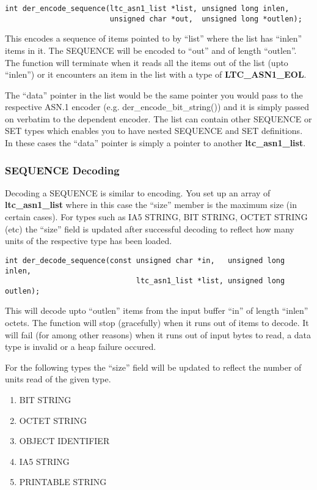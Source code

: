 \documentclass[a4paper]{book}
\begin{document}
\begin{verbatim}
int der_encode_sequence(ltc_asn1_list *list, unsigned long inlen,
                        unsigned char *out,  unsigned long *outlen);
\end{verbatim}
This encodes a sequence of items pointed to by ``list'' where the list has ``inlen'' items in it.  The SEQUENCE will be encoded to ``out'' and of length ``outlen''.  The
function will terminate when it reads all the items out of the list (upto ``inlen'') or it encounters an item in the list with a type of \textbf{LTC\_ASN1\_EOL}.

The ``data'' pointer in the list would be the same pointer you would pass to the respective ASN.1 encoder (e.g. der\_encode\_bit\_string()) and it is simply passed on
verbatim to the dependent encoder.  The list can contain other SEQUENCE or SET types which enables you to have nested SEQUENCE and SET definitions.  In these cases
the ``data'' pointer is simply a pointer to another \textbf{ltc\_asn1\_list}.

\subsubsection{SEQUENCE Decoding}


Decoding a SEQUENCE is similar to encoding.  You set up an array of \textbf{ltc\_asn1\_list} where in this case the ``size'' member is the maximum size 
(in certain cases).  For types such as IA5 STRING, BIT STRING, OCTET STRING (etc) the ``size'' field is updated after successful decoding to reflect how many
units of the respective type has been loaded.  

\begin{verbatim}
int der_decode_sequence(const unsigned char *in,   unsigned long  inlen,
                              ltc_asn1_list *list, unsigned long  outlen);
\end{verbatim}

This will decode upto ``outlen'' items from the input buffer ``in'' of length ``inlen'' octets.  The function will stop (gracefully) when it runs out of items to decode.
It will fail (for among other reasons) when it runs out of input bytes to read, a data type is invalid or a heap failure occured.

For the following types the ``size'' field will be updated to reflect the number of units read of the given type.
\begin{enumerate}
   \item BIT STRING
   \item OCTET STRING
   \item OBJECT IDENTIFIER
   \item IA5 STRING
   \item PRINTABLE STRING
\end{enumerate}
\end{document}

